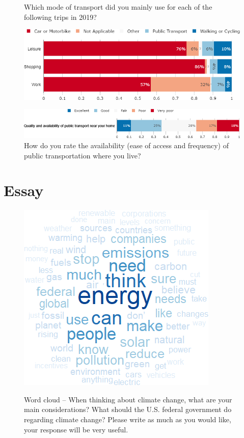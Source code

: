 \documentclass[aspectratio=169,9pt,dvipsnames]{beamer}
\begin{document}
\begin{frame}{}%
\begin{figure}[h!]
\centering
\caption{Which mode of transport did you mainly use for each of the following trips in 2019?}
\includegraphics[width=.7\textwidth]{../figures/US/transport_US.png} \\
\vspace{.5cm}
\caption{How do you rate the availability (ease of access and frequency) of public transportation where you live?}
\includegraphics[width=.9\textwidth]{../figures/US/availability_transport_US.png}
\end{figure}
\end{frame}

\section{Essay}


\begin{frame}{}%
\begin{figure}[h!]
\centering
\caption{Word cloud -- When thinking about climate change, what are your main considerations? What should the U.S. federal government do regarding climate change?
Please write as much as you would like, your response will be very useful.}
\includegraphics[width=.5\textwidth]{../figures/US/CC_field_US.png} \\
\end{figure}
\end{frame}
\end{document}
